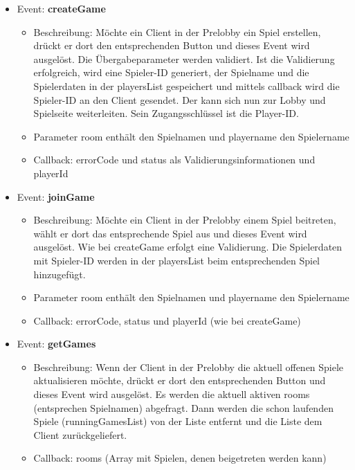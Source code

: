 \documentclass[conference]{IEEEtran}
\begin{document}
\begin{itemize}

\item Event: \textbf{createGame}
\begin{itemize}
\item Beschreibung: Möchte ein Client in der Prelobby ein Spiel erstellen, drückt er dort den entsprechenden Button und dieses Event wird ausgelöst. Die Übergabeparameter werden validiert. Ist die Validierung erfolgreich, wird eine Spieler-ID generiert, der Spielname und die Spielerdaten in der playersList gespeichert und mittels callback wird die Spieler-ID an den Client gesendet. Der kann sich nun zur Lobby und Spielseite weiterleiten. Sein Zugangsschlüssel ist die Player-ID.
\item Parameter \glqq room\grqq{} enthält den Spielnamen und \glqq playername\grqq{} den Spielername
\item Callback: \glqq errorCode\grqq{} und \glqq status\grqq{} als Validierungsinformationen und \glqq playerId\grqq{}
\end{itemize}

\item Event: \textbf{joinGame}
\begin{itemize}
\item Beschreibung: Möchte ein Client in der Prelobby einem Spiel beitreten, wählt er dort das entsprechende Spiel aus und dieses Event wird ausgelöst. Wie bei createGame erfolgt eine Validierung. Die Spielerdaten mit Spieler-ID werden in der playersList beim entsprechenden Spiel hinzugefügt.
\item Parameter \glqq room\grqq{} enthält den Spielnamen und \glqq playername\grqq{} den Spielername
\item Callback: \glqq errorCode\grqq{}, \glqq status\grqq{} und \glqq playerId\grqq{} (wie bei createGame)
\end{itemize}

\item Event: \textbf{getGames}
\begin{itemize}
\item Beschreibung: Wenn der Client in der Prelobby die aktuell offenen Spiele aktualisieren möchte, drückt er dort den entsprechenden Button und dieses Event wird ausgelöst. Es werden die aktuell aktiven rooms (entsprechen Spielnamen) abgefragt. Dann werden die schon laufenden Spiele (runningGamesList) von der Liste entfernt und die Liste dem Client zurückgeliefert.
\item Callback: \glqq rooms\grqq{} (Array mit Spielen, denen beigetreten werden kann)
\end{itemize}


\end{itemize}
\end{document}

